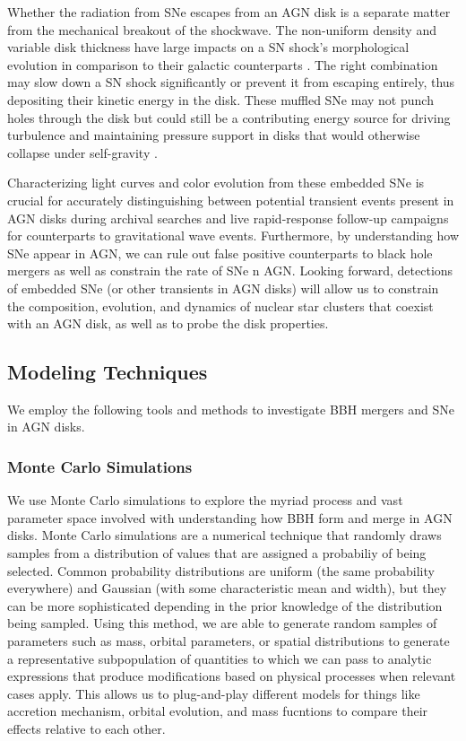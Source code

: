Whether the radiation from SNe escapes from an AGN disk is a separate matter from the mechanical breakout of the shockwave.
The non-uniform density and variable disk thickness have large impacts on a SN shock's morphological evolution in comparison to their galactic counterparts \citep{MacLowMcCray88}.
The right combination may slow down a SN shock significantly or prevent it from escaping entirely, thus depositing their kinetic energy in the disk.
These muffled SNe may not punch holes through the disk but could still be a contributing energy source for driving turbulence and maintaining pressure support in disks that would otherwise collapse under self-gravity \citep{Rozyczka+95,Moranchel+21}.

Characterizing light curves and color evolution from these embedded SNe is crucial for accurately distinguishing between potential transient events present in AGN disks during archival searches and live rapid-response follow-up campaigns for counterparts to gravitational wave events.
Furthermore, by understanding how SNe appear in AGN, we can rule out false positive counterparts to black hole mergers as well as constrain the rate of SNe n AGN.
Looking forward, detections of embedded SNe (or other transients in AGN disks) will allow us to constrain the composition, evolution, and dynamics of nuclear star clusters that coexist with an AGN disk, as well as to probe the disk properties.


\subsection{Modeling Techniques}

We employ the following tools and methods to investigate BBH mergers and SNe in AGN disks.

\subsubsection{Monte Carlo Simulations}

We use Monte Carlo simulations to explore the myriad process and vast parameter space involved with understanding how BBH form and merge in AGN disks.
Monte Carlo simulations are a numerical technique that randomly draws samples from a distribution of values that are assigned a probabiliy of being selected.
Common probability distributions are uniform (the same probability everywhere) and Gaussian (with some characteristic mean and width), but they can be more sophisticated depending in the prior knowledge of the distribution being sampled.
Using this method, we are able to generate random samples of parameters such as mass, orbital parameters, or spatial distributions to generate a representative subpopulation of quantities to which we can pass to analytic expressions that produce modifications based on physical processes when relevant cases apply.
This allows us to plug-and-play different models for things like accretion mechanism, orbital evolution, and mass fucntions to compare their effects relative to each other.

